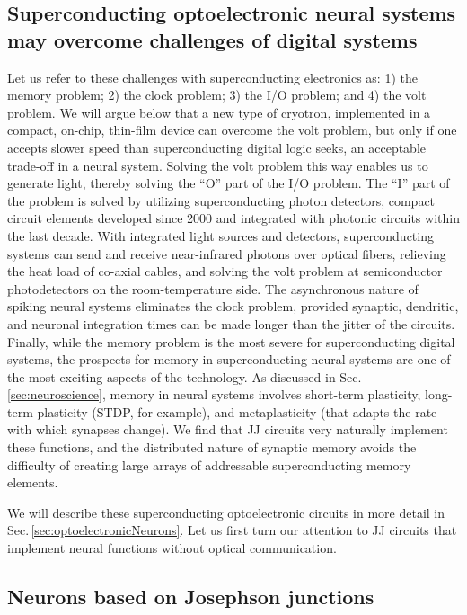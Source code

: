 \documentclass[twocolumn]{article}
\begin{document}
\subsection{Superconducting optoelectronic neural systems may overcome challenges of digital systems}
Let us refer to these challenges with superconducting electronics as: 1) the memory problem; 2) the clock problem; 3) the I/O problem; and 4) the volt problem. We will argue below that a new type of cryotron, implemented in a compact, on-chip, thin-film device can overcome the volt problem, but only if one accepts slower speed than superconducting digital logic seeks, an acceptable trade-off in a neural system. Solving the volt problem this way enables us to generate light, thereby solving the ``O'' part of the I/O problem. The ``I'' part of the problem is solved by utilizing superconducting photon detectors, compact circuit elements developed since 2000 and integrated with photonic circuits within the last decade. With integrated light sources and detectors, superconducting systems can send and receive near-infrared photons over optical fibers, relieving the heat load of co-axial cables, and solving the volt problem at semiconductor photodetectors on the room-temperature side. The asynchronous nature of spiking neural systems eliminates the clock problem, provided synaptic, dendritic, and neuronal integration times can be made longer than the jitter of the circuits. Finally, while the memory problem is the most severe for superconducting digital systems, the prospects for memory in superconducting neural systems are one of the most exciting aspects of the technology. As discussed in Sec.\,\ref{sec:neuroscience}, memory in neural systems involves short-term plasticity, long-term plasticity (STDP, for example), and metaplasticity (that adapts the rate with which synapses change). We find that JJ circuits very naturally implement these functions, and the distributed nature of synaptic memory avoids the difficulty of creating large arrays of addressable superconducting memory elements. 

We will describe these superconducting optoelectronic circuits in more detail in Sec.\,\ref{sec:optoelectronicNeurons}. Let us first turn our attention to JJ circuits that implement neural functions without optical communication.

\subsection{Neurons based on Josephson junctions}
\end{document}
